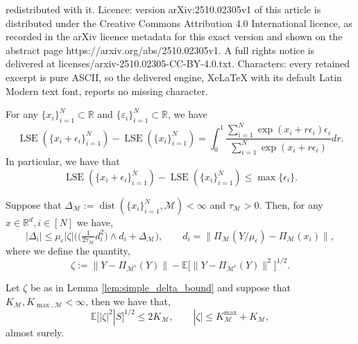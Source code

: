 \documentclass[10pt,a4paper]{amsart}
\newcommand{\E}{\mathbb{E}}
\newcommand{\M}{{\mathcal{M}}}
\newcommand{\Pieps}{\Pi_{\M^\epsilon}}
\newcommand{\R}{\mathbb{R}}
\newcommand{\dist}{\operatorname{dist}}
\newcommand{\gap}{\Delta_\M}
\newcommand{\lse}{\operatorname{LSE}}
\begin{document}
redistributed with it. Licence: version arXiv:2510.02305v1 of this article is distributed under the Creative Commons Attribution 4.0 International licence, as recorded in the arXiv licence metadata for this exact version and shown on the abstract page https://arxiv.org/abs/2510.02305v1. A full rights notice is delivered at licenses/arxiv-2510.02305-CC-BY-4.0.txt. Characters: every retained excerpt is pure ASCII, so the delivered engine, XeLaTeX with its default Latin Modern text font, reports no missing character.
\begin{lemma}\label{lem:lse_properties}
For any \(\{x_i\}_{i=1}^N \subset \R\) and \(\{\varepsilon_i\}_{i=1}^N \subset \R\), we have
\begin{equation}\label{eq:lse_properties_1}
    \lse(\{x_i + \epsilon_i\}_{i=1}^N) - \lse(\{x_i\}_{i=1}^N) = \int_0^1 \frac{\sum_{i=1}^N \exp(x_i + r \epsilon_i) \epsilon_i}{\sum_{i=1}^N \exp(x_i + r \epsilon_i)} dr.
\end{equation}
In particular, we have that
\begin{equation}\label{eq:lse_properties_2}
    \lse(\{x_i + \epsilon_i\}_{i=1}^N) - \lse(\{x_i\}_{i=1}^N) \leq \max\{\epsilon_i\}.
\end{equation}
\end{lemma}

\begin{lemma}\label{lem:simple_delta_bound}
Suppose that \(\gap := \dist(\{x_i\}_{i=1}^N, \M) < \infty\) and \(\tau_\M > 0\). Then, for any \(x \in \R^d, i \in [N]\) we have,
\begin{equation*}
    |\Delta_i| \leq \mu_\epsilon |\zeta| \Big ( \Big ( \tfrac{1}{2 \tau_\M} d_i^2 \Big ) \wedge d_i + \gap \Big ), \qquad d_i = \| \Pi_\M(Y/\mu_\epsilon) - \Pi_\M(x_i)\|,
\end{equation*}
where we define the quantity,
\begin{equation*}
    \zeta := \|Y - \Pieps(Y)\| - \E \Big [ \|Y - \Pieps(Y)\|^2 \Big ]^{1/2}.
\end{equation*}
\end{lemma}

\begin{lemma}\label{lem:zeta_bound}
Let \(\zeta\) be as in Lemma \ref{lem:simple_delta_bound} and suppose that \(K_\M, K_{\max, \M} < \infty\), then we have that,
\begin{equation*}
    \E[|\zeta|^2|S]^{1/2} \leq 2 K_\M, \qquad |\zeta| \leq K^{\max}_\M + K_\M,
\end{equation*}
almost surely.
\end{lemma}
\end{document}

